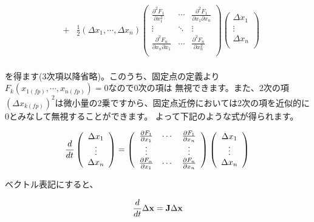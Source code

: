 \[\begin{array}{ccl}
&
+
&
\displaystyle\frac{1}{2}
\left( \Delta x_1 , \cdots , \Delta x_n \right)
\left(
\begin{array}{ccc}
\frac{\partial^2 F_1}{\partial x_1^2} & \cdots & \frac{\partial^2 F_1}{\partial x_1 \partial x_n} \\
\vdots                            &    \ddots    & \vdots\\
\frac{\partial^2 F_n}{\partial x_n \partial x_1} & \cdots & \frac{\partial^2 F_n}{\partial x_n^2} \\
\end{array}
\right)
\left(
\begin{array}{c}
\Delta x_1\\
\vdots \\
\Delta x_n\\
\end{array}
\right)\\

\end{array}
\]

を得ます(3次項以降省略)。このうち、固定点の定義より\(F_k(x_{1(fp)}, \cdots , x_{n(fp)})=0\)なので0次の項は
無視できます。また、2次の項\((\Delta x_{k(fp)})^2\)は微小量の2乗ですから、固定点近傍においては2次の項を近似的に0とみなして無視することができます。
よって下記のような式が得られます。

\[
\frac{d}{dt}
\left(
\begin{array}{c}
\Delta x_1\\
\vdots \\
\Delta x_n\\
\end{array}
\right)
=
\left(
\begin{array}{ccc}
\frac{\partial F_1}{\partial x_1} & \cdots & \frac{\partial F_1}{\partial x_n} \\
\vdots                            &        & \vdots\\
\frac{\partial F_n}{\partial x_1} & \cdots & \frac{\partial F_n}{\partial x_n} \\
\end{array}
\right)
\left(
\begin{array}{c}
\Delta x_1\\
\vdots \\
\Delta x_n\\
\end{array}
\right)\\
\]

ベクトル表記にすると、

\[ \frac{d}{dt}\Delta {\bf x} = {\bf J}\Delta {\bf x}\]

